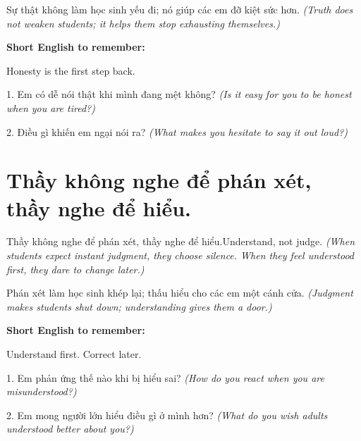 \begin{baihoc}
Sự thật không làm học sinh yếu đi; nó giúp các em đỡ kiệt sức hơn.
\textit{(Truth does not weaken students; it helps them stop exhausting themselves.)}
\end{baihoc}

\begin{ghinhoanh}
\textbf{Short English to remember:}

Honesty is the first step back.

\end{ghinhoanh}

\begin{tuhocnhanh}
1. Em có dễ nói thật khi mình đang mệt không? \textit{(Is it easy for you to be honest when you are tired?)}

2. Điều gì khiến em ngại nói ra? \textit{(What makes you hesitate to say it out loud?)}
\end{tuhocnhanh}
\ngancach


\section{Thầy không nghe để phán xét, thầy nghe để hiểu.}
\begin{truyen}{Thầy không nghe để phán xét, thầy nghe để hiểu.}{Understand, not judge.}
\textit{(When students expect instant judgment, they choose silence. When they feel understood first, they dare to change later.)}
\end{truyen}

\begin{baihoc}
Phán xét làm học sinh khép lại; thấu hiểu cho các em một cánh cửa.
\textit{(Judgment makes students shut down; understanding gives them a door.)}
\end{baihoc}

\begin{ghinhoanh}
\textbf{Short English to remember:}

Understand first. Correct later.

\end{ghinhoanh}

\begin{tuhocnhanh}
1. Em phản ứng thế nào khi bị hiểu sai? \textit{(How do you react when you are misunderstood?)}

2. Em mong người lớn hiểu điều gì ở mình hơn? \textit{(What do you wish adults understood better about you?)}
\end{tuhocnhanh}
\ngancach


